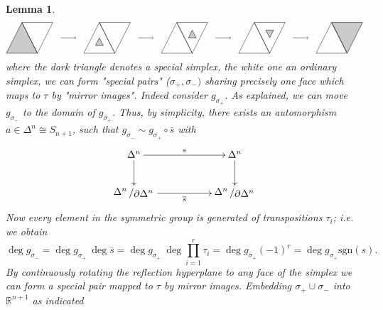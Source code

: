 \documentclass[11pt]{book}
\numberwithin{dummy}{section}
\newtheorem{lemma}[theorem]{Lemma}
\theoremstyle{nonumberbreak}
\newenvironment{pr}[1][]{\ifthenelse{\equal{#1}{}}{\proof}{\proof[#1]}\rm}{\endproof}
\newcommand{\slant}[2]{{\raisebox{.1em}{$#1$}\left/\raisebox{-.1em}{$#2$}\right.}}
\begin{document}
\begin{spacing}{1.4}
\begin{lemma}
\begin{pr}
$$
\begin{tikzpicture}[scale=0.65]
\draw[fill=black,opacity=0.2] (0,0) -- (2,0) -- (1,2) -- (0,0);
\draw (0,0) -- (2,0) -- (1,2) -- (0,0);
\draw(2,0) -- (3,2) -- (1,2) -- (2,0);

\draw[->] (3.5,1) -- (4.5,1);

\draw[fill=black,opacity=0.2] (5.75,0.5) -- (6.25,0.5) -- (6,1) -- (5.75,0.5);
\draw (5.75,0.5) -- (6.25,0.5) -- (6,1) -- (5.75,0.5);
\draw (5,0) -- (7,0) -- (6,2) -- (5,0);
\draw(7,0) -- (8,2) -- (6,2) -- (7,0);

\draw[->] (8.5,1) -- (9.5,1);

\draw (10,0) -- (12,0) -- (11,2) -- (10,0);
\draw(12,0) -- (13,2) -- (11,2) -- (12,0);
\draw (11.75,1) -- (12.25,1) -- (12,1.5) -- (11.75,1);
\draw[fill=black,opacity=0.2] (11.75,1) -- (12.25,1) -- (12,1.5) -- (11.75,1);

\draw[->] (13.5,1) -- (14.5,1);

\draw (15,0) -- (17,0) -- (16,2) -- (15,0);
\draw (17,0) -- (18,2) -- (16,2) -- (17,0);
\draw (16.75,1.5) -- (17.25,1.5) -- (17,1) -- (16.75,1.5);
\draw[fill=black, opacity=0.2] (16.75,1.5) -- (17.25,1.5) -- (17,1) -- (16.75,1.5);

\draw[->] (18.5,1) -- (19.5,1);

\draw (20,0) -- (22,0) -- (21,2) -- (20,0);
\draw (22,0) -- (23,2) -- (21,2) -- (22,0);
\draw[fill=black,opacity =0.2] (22,0) -- (23,2) -- (21,2) -- (22,0);

\end{tikzpicture}
$$
where the dark triangle denotes a special simplex, the white one an ordinary simplex, we can form "special pairs" ($\sigma_+, \sigma_-)$ sharing precisely one face which maps to $\tau$ by "mirror images". Indeed consider $g_{\sigma_+}$. As explained, we can move $g_{\sigma_-}$ to the domain of $g_{\sigma_+}$. Thus, by simplicity, there exists an automorphism $a \in \Delta^n \cong S_{n+1}$, such that $g_{\sigma_-} \sim g_{\sigma_+} \circ \overline{s}$ with 
$$
\begin{xy}
\xymatrix{
\Delta^n \ar[rr]^{s} \ar[d] && \Delta^n \ar[d] \\
\slant{\Delta^n}{\partial \Delta^n} \ar[rr]_{\overline{s}} && \slant{\Delta^n}{\partial \Delta^n}
}
\end{xy}
$$
Now every element in the symmetric group is generated of transpositions $\tau_i$; i.e. we obtain
$$\deg g_{\sigma_-} = \deg g_{\sigma_+} \ \deg \overline{s} = \deg g_{\sigma_+} \ \deg \prod_{i=1}^r \tau_i = \deg g_{\sigma_+} (-1)^r = \deg g_{\sigma_+} \mathrm{sgn}(s).$$
By continuously rotating the reflection hyperplane to any face of the simplex we can form a special pair mapped to $\tau$ by mirror images.
Embedding $\sigma_+ \cup \sigma_-$ into $\mathbb{R}^{n+1}$ as indicated


\end{pr}
\end{lemma}
\end{spacing}
\end{document}
